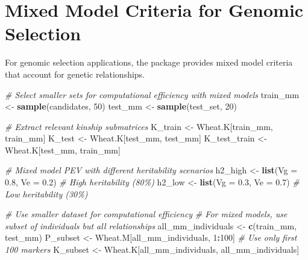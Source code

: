 \documentclass[
]{article}
\newenvironment{Shaded}{\begin{snugshade}}{\end{snugshade}}
\newcommand{\AttributeTok}[1]{\textcolor[rgb]{0.13,0.29,0.53}{#1}}
\newcommand{\CommentTok}[1]{\textcolor[rgb]{0.56,0.35,0.01}{\textit{#1}}}
\newcommand{\DecValTok}[1]{\textcolor[rgb]{0.00,0.00,0.81}{#1}}
\newcommand{\FloatTok}[1]{\textcolor[rgb]{0.00,0.00,0.81}{#1}}
\newcommand{\FunctionTok}[1]{\textcolor[rgb]{0.13,0.29,0.53}{\textbf{#1}}}
\newcommand{\NormalTok}[1]{#1}
\newcommand{\OtherTok}[1]{\textcolor[rgb]{0.56,0.35,0.01}{#1}}
\newcommand{\SpecialCharTok}[1]{\textcolor[rgb]{0.81,0.36,0.00}{\textbf{#1}}}
\begin{document}
\section{Mixed Model Criteria for Genomic
Selection}\label{mixed-model-criteria-for-genomic-selection}

For genomic selection applications, the package provides mixed model
criteria that account for genetic relationships.

\begin{Shaded}
\begin{Highlighting}[]
\CommentTok{\# Select smaller sets for computational efficiency with mixed models}
\NormalTok{train\_mm }\OtherTok{\textless{}{-}} \FunctionTok{sample}\NormalTok{(candidates, }\DecValTok{50}\NormalTok{)}
\NormalTok{test\_mm }\OtherTok{\textless{}{-}} \FunctionTok{sample}\NormalTok{(test\_set, }\DecValTok{20}\NormalTok{)}

\CommentTok{\# Extract relevant kinship submatrices}
\NormalTok{K\_train }\OtherTok{\textless{}{-}}\NormalTok{ Wheat.K[train\_mm, train\_mm]}
\NormalTok{K\_test }\OtherTok{\textless{}{-}}\NormalTok{ Wheat.K[test\_mm, test\_mm]}
\NormalTok{K\_test\_train }\OtherTok{\textless{}{-}}\NormalTok{ Wheat.K[test\_mm, train\_mm]}

\CommentTok{\# Mixed model PEV with different heritability scenarios}
\NormalTok{h2\_high }\OtherTok{\textless{}{-}} \FunctionTok{list}\NormalTok{(}\AttributeTok{Vg =} \FloatTok{0.8}\NormalTok{, }\AttributeTok{Ve =} \FloatTok{0.2}\NormalTok{)  }\CommentTok{\# High heritability (80\%)}
\NormalTok{h2\_low }\OtherTok{\textless{}{-}} \FunctionTok{list}\NormalTok{(}\AttributeTok{Vg =} \FloatTok{0.3}\NormalTok{, }\AttributeTok{Ve =} \FloatTok{0.7}\NormalTok{)   }\CommentTok{\# Low heritability (30\%)}

\CommentTok{\# Use smaller dataset for computational efficiency}
\CommentTok{\# For mixed models, use subset of individuals but all relationships}
\NormalTok{all\_mm\_individuals }\OtherTok{\textless{}{-}} \FunctionTok{c}\NormalTok{(train\_mm, test\_mm)}
\NormalTok{P\_subset }\OtherTok{\textless{}{-}}\NormalTok{ Wheat.M[all\_mm\_individuals, }\DecValTok{1}\SpecialCharTok{:}\DecValTok{100}\NormalTok{]  }\CommentTok{\# Use only first 100 markers}
\NormalTok{K\_subset }\OtherTok{\textless{}{-}}\NormalTok{ Wheat.K[all\_mm\_individuals, all\_mm\_individuals]}


\end{Highlighting}
\end{Shaded}
\end{document}
